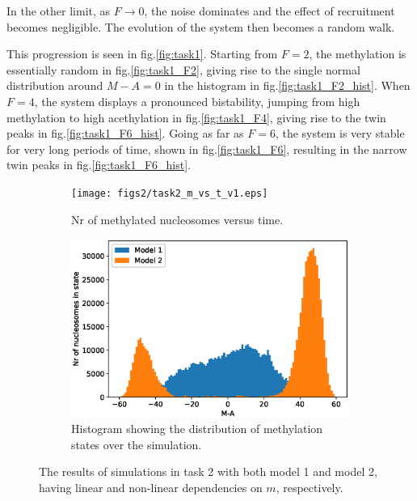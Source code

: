 \documentclass[fleqn,10pt]{SelfArx} %
\begin{document}
In the other limit, as $F\to 0$, the noise dominates and the effect of recruitment becomes negligible. The evolution of the system then becomes a random walk. 

This progression is seen in fig.\eqref{fig:task1}. Starting from $F=2$, the methylation is essentially random in fig.\eqref{fig:task1_F2}, giving rise to the single normal distribution around $M-A=0$ in the histogram in fig.\eqref{fig:task1_F2_hist}. When $F=4$, the system displays a pronounced bistability, jumping from high methylation to high acethylation in fig.\eqref{fig:task1_F4}, giving rise to the twin peaks in fig.\eqref{fig:task1_F6_hist}. Going as far as $F=6$, the system is very stable for very long periods of time, shown in fig.\eqref{fig:task1_F6}, resulting in the narrow twin peaks in fig.\eqref{fig:task1_F6_hist}.


\begin{figure}[ht!]
	\centering
	\begin{subfigure}[t]{.49\textwidth}
		\centering
		\texttt{[image: figs2/task2\_m\_vs\_t\_v1.eps]}
		\caption{Nr of methylated nucleosomes versus time. }
		\label{fig:task2_m_vs_t}
	\end{subfigure}
	\begin{subfigure}[t]{.49\textwidth}
		\centering
		\includegraphics[width= \linewidth]{figs2/task2_hist_v1.eps}
		\caption{Histogram showing the distribution of methylation states over the simulation.}
		\label{fig:task2_hist}
	\end{subfigure}
		\caption{The results of simulations in task 2 with both model 1 and model 2, having linear and non-linear dependencies on $m$, respectively.}
		\label{fig:task2}
\end{figure}
\end{document}
